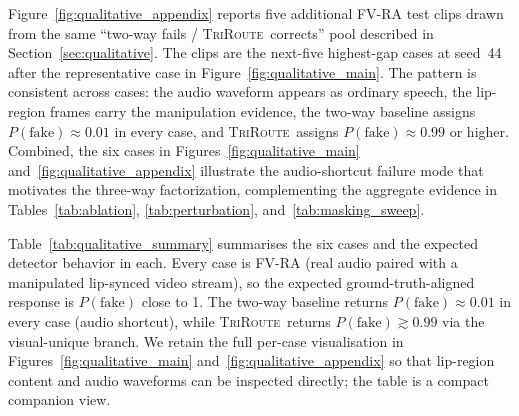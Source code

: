 \documentclass{article}
\newcommand{\method}{\textsc{TriRoute}}
\begin{document}
Figure~\ref{fig:qualitative_appendix} reports five additional FV-RA test clips drawn from the same ``two-way fails / \method\ corrects'' pool described in Section~\ref{sec:qualitative}. The clips are the next-five highest-gap cases at seed~44 after the representative case in Figure~\ref{fig:qualitative_main}. The pattern is consistent across cases: the audio waveform appears as ordinary speech, the lip-region frames carry the manipulation evidence, the two-way baseline assigns $P(\mathrm{fake}) \approx 0.01$ in every case, and \method\ assigns $P(\mathrm{fake}) \approx 0.99$ or higher. Combined, the six cases in Figures~\ref{fig:qualitative_main} and~\ref{fig:qualitative_appendix} illustrate the audio-shortcut failure mode that motivates the three-way factorization, complementing the aggregate evidence in Tables~\ref{tab:ablation}, \ref{tab:perturbation}, and~\ref{tab:masking_sweep}.

Table~\ref{tab:qualitative_summary} summarises the six cases and the expected detector behavior in each. Every case is FV-RA (real audio paired with a manipulated lip-synced video stream), so the expected ground-truth-aligned response is $P(\mathrm{fake})$ close to 1. The two-way baseline returns $P(\mathrm{fake}) \approx 0.01$ in every case (audio shortcut), while \method\ returns $P(\mathrm{fake}) \gtrsim 0.99$ via the visual-unique branch. We retain the full per-case visualisation in Figures~\ref{fig:qualitative_main} and~\ref{fig:qualitative_appendix} so that lip-region content and audio waveforms can be inspected directly; the table is a compact companion view.
\end{document}
